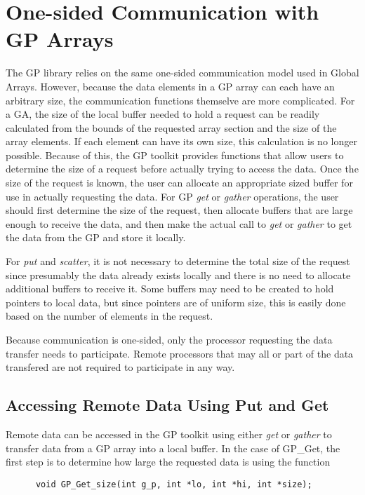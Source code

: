 \chapter{One-sided Communication with GP Arrays}

The GP library relies on the same one-sided communication model used in Global
Arrays. However, because the data elements in a GP array can each have an
arbitrary size, the communication functions themselve are more complicated. For
a GA, the size of the local buffer needed to hold a request can be readily
calculated from the bounds of the requested array section and the size of the
array elements. If each element can have its own size, this calculation is no
longer possible. Because of this, the GP toolkit provides functions that allow
users to determine the size of a request before actually trying to access the
data. Once the size of the request is known, the user can allocate an
appropriate sized buffer for use in actually requesting the data. For GP
\emph{get} or \emph{gather} operations, the user should first determine the size
of the request, then allocate buffers that are large enough to receive the data,
and then make the actual call to \emph{get} or \emph{gather} to get the data
from the GP and store it locally.

For \emph{put} and \emph{scatter}, it is not necessary to determine the total
size of the request since presumably the data already exists locally and there
is no need to allocate additional buffers to receive it. Some buffers may need to
be created to hold pointers to local data, but since pointers are of uniform size,
this is easily done based on the number of elements in the request.

Because communication is one-sided, only the processor requesting the data
transfer needs to participate. Remote processors that may all or part of the
data transfered are not required to participate in any way.

\section{Accessing Remote Data Using Put and Get}
Remote data can be accessed in the GP toolkit using either \emph{get} or
\emph{gather} to transfer data from a GP array into a local buffer. In the case
of GP\_Get, the first step is to determine how large the requested data is using
the function

\begin{verbatim}
      void GP_Get_size(int g_p, int *lo, int *hi, int *size);
\end{verbatim}


